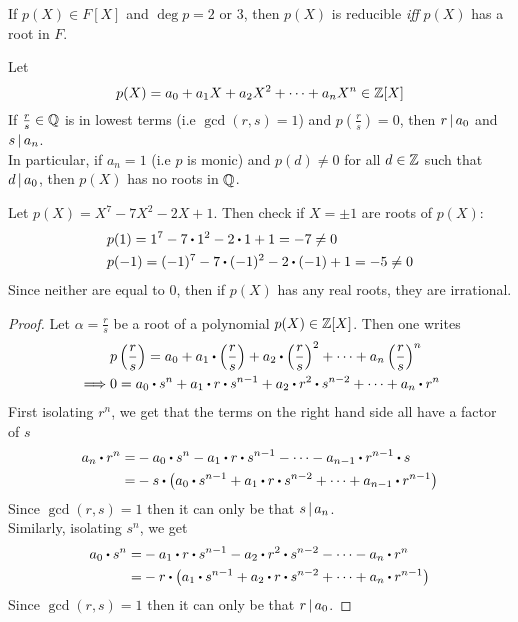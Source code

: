 \documentclass[../Main.tex]{subfiles}
\begin{document}
\begin{crl}[title = Quadratics and cubics reducible \textit{iff} they have roots in \texorpdfstring{$F$}{F},label=14.5]
	If $p(X)\in F[X]$ and $\deg p = 2$ or $3$, then $p(X)$ is reducible \textit{iff} $p(X)$ has a root in $F$.
\end{crl}
\begin{prop}[title= Rational Root Theorem,label=rational]
	Let 
	\[p(X)=a_0+a_1X+a_2X^2+\dots+a_nX^n\in \mathbb{Z}[X]\]
	If $\frac{r}{s}\in \mathbb{Q}$ is in lowest terms (i.e $\gcd(r,s)=1$) and $p\left(\frac{r}{s}\right)=0$, then $r \, | \, a_0$ and $s \, | \, a_n$.\\
	In particular, if $a_n=1$ (i.e $p$ is monic) and $p(d)\ne 0$ for all $d \in \mathbb{Z}$ such that $d \, | \, a_0$, then $p(X)$ has no roots in $\mathbb{Q}$.
\end{prop}
\begin{example}
	Let $p(X) = X^7-7X^2-2X+1$. Then check if $X=\pm 1$ are roots of $p(X)$:
	\begin{align*}
	&p(1)=1^7-7\rdot 1^2-2\rdot 1+1=-7\ne 0\\
	&p(-1)=(-1)^7-7\rdot (-1)^2-2\rdot (-1)+1=-5\ne 0
	\end{align*}
	Since neither are equal to $0$, then if $p(X)$ has any real roots, they are irrational.
\end{example}
\begin{proof}
	Let $\alpha=\frac{r}{s}$ be a root of a polynomial $p(X) \in \mathbb{Z}[X]$. Then one writes
	\begin{align*}
		&p\left(\frac{r}{s}\right)=a_0+a_1\rdot \left(\frac{r}{s}\right)+a_2\rdot \left(\frac{r}{s}\right)^2+\dots + a_n \left(\frac{r}{s}\right)^n\\
		\implies& 0 = a_0\rdot s^n +a_1\rdot r\rdot s^{n-1}+a_2\rdot r^2\rdot s^{n-2}+\dots+a_n\rdot r^n
	\end{align*}
	First isolating $r^n$, we get that the terms on the right hand side all have a factor of $s$
	\begin{align*}
	a_n\rdot r^n =& -a_0 \rdot s^n-a_1\rdot r\rdot s^{n-1}-\dots-a_{n-1}\rdot r^{n-1}\rdot s \\
	=& -s \rdot \left(a_0\rdot s^{n-1}+a_1\rdot r\rdot s^{n-2}+\dots+a_{n-1}\rdot r^{n-1}\right)
	\end{align*}
	Since $\gcd(r,s)=1$ then it can only be that $s \, | \, a_n$.\\
	Similarly, isolating $s^n$, we get
	\begin{align*}
	a_0\rdot s^n =& -a_1\rdot r\rdot s^{n-1}-a_2\rdot r^2\rdot s^{n-2}-\dots-a_n\rdot r^n\\
	=& -r\rdot \left(a_1\rdot s^{n-1}+a_2\rdot r\rdot s^{n-2}+\dots+a_n\rdot r^{n-1}\right)
	\end{align*}
	Since $\gcd(r,s)=1$ then it can only be that $r \, | \, a_0$.
\end{proof}
\end{document}
